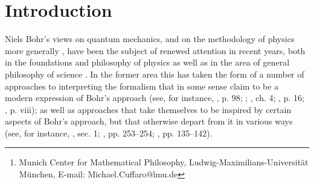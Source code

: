 \documentclass[12pt,english,twoside]{article}
\date{31 Aug 2023}
\title{\documentTitle}
\author{Michael E. Cuffaro\footnote{Munich Center for Mathematical Philosophy,
      Ludwig-Maximilians-Universit\"at M\"unchen,
      E-mail: Michael.Cuffaro@lmu.de}}
\numberwithin{equation}{section}
\begin{document}
\maketitle

\thispagestyle{empty}

\begin{abstract}
  I flesh out the sense in which the informational approach to interpreting quantum mechanics, as defended by Pitowsky and Bub and lately by a number of other authors, is (neo-)Bohrian. I argue that on this approach, quantum mechanics represents what Bohr called a ``natural generalisation of the ordinary causal description'' in the sense that the idea (which philosophers of science like Stein have argued for on the grounds of practical necessity), that understanding a theory as a theory of physics requires that we be able to ``schematise the observer'' within it, is elevated in quantum mechanics to the level of a postulate. I argue that the approach's central concern is with the methodological question of how to assign physical properties to what one takes to be a system in a given experimental context, rather than the metaphysical question of what a given state vector represents independently of any context, and I show how the quantum generalisation of the concept of an open system may be used to assuage Einstein's complaint that the orthodox approach to quantum mechanics runs afoul of the supposedly fundamental methodological requirement to the effect that one must always be able, according to Einstein, to treat spatially separated systems as isolated from one another.
\end{abstract}

\section{Introduction}
\label{s:introduction}

Niels Bohr's views on quantum mechanics, and on the methodology of physics more generally \citep[]{demopoulosOnTheories, perovic2021}, have been the subject of renewed attention in recent years, both in the foundations and philosophy of physics as well as in the area of general philosophy of science \citep[see, for instance,][]{evans2020}. In the former area this has taken the form of a number of approaches to interpreting the formalism that in some sense claim to be a modern expression of Bohr's approach (see, for instance, \citealt{brukner2017}, p. 98; \citealt{bub2017}; \citealt{demopoulosOnTheories}, ch. 4; \citealt{3m2020}, p. 16; \citealt{landsman2017}, p. viii); as well as approaches that take themselves to be inspired by certain aspects of Bohr's approach, but that otherwise depart from it in various ways (see, for instance, \citealt{fuchs2017}, sec. 1; \citealt{healey2017}, pp. 253--254; \citealt{rovelli2021}, pp. 135--142).
\end{document}
